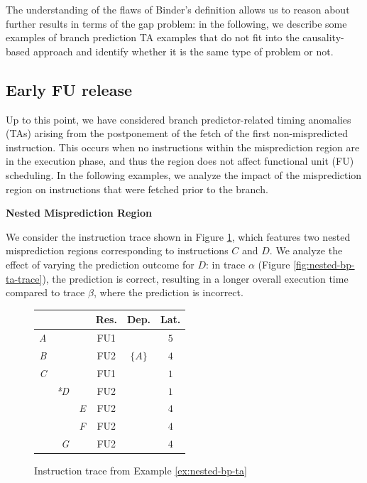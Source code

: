 The understanding of the flaws of Binder's definition \cite{binder_definitions_2022} allows us to reason about further results in terms of the gap problem: in the following, we describe some examples of branch prediction TA examples that do not fit into the causality-based approach and identify whether it is the same type of problem or not.




\subsection{Early FU release}

Up to this point, we have considered branch predictor-related timing anomalies (TAs) arising from the postponement of the fetch of the first non-mispredicted instruction. This occurs when no instructions within the misprediction region are in the execution phase, and thus the region does not affect functional unit (FU) scheduling. In the following examples, we analyze the impact of the misprediction region on instructions that were fetched prior to the branch.

\begin{example}
\textbf{Nested Misprediction Region}

We consider the instruction trace shown in Figure \ref{fig:nested-bp-ta-input}, which features two nested misprediction regions corresponding to instructions $C$ and $D$. We analyze the effect of varying the prediction outcome for $D$: in trace $\alpha$ (Figure \ref{fig:nested-bp-ta-trace}), the prediction is correct, resulting in a longer overall execution time compared to trace $\beta$, where the prediction is incorrect.
    
\label{ex:nested-bp-ta}
\end{example}

\begin{figure}[H]
    \centering
    \begin{tabular}{rrr|ccc}
    &  &  & Res. & Dep. & Lat. \\ \hline
    \textit{A} &  &  & FU1 &  & $5$ \\
    \textit{B} &  &  & FU2 & $\{A\}$ & $4$ \\
    \textit{C} &  &  & FU1 &  & $1$ \\
    & \textit{*D} &  & FU2 &  & $1$ \\
    &  & \textit{E} & FU2 &  & $4$ \\
    &  & \textit{F} & FU2 &  & $4$ \\
    & \textit{G} &  & FU2 &  & $4$ \\
    \end{tabular}
    \caption{Instruction trace from Example \ref{ex:nested-bp-ta}}
    \label{fig:nested-bp-ta-input}
\end{figure}



